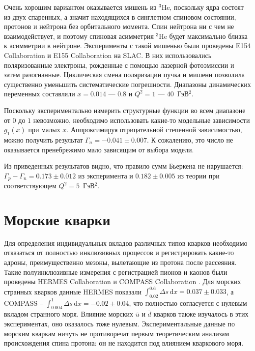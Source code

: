 \documentclass[
	a4paper, 10pt,
	twocolumn
]{article}
\def\d{\,\mathrm{d}}
\def\div{\text{ --- }}
\begin{document}
Очень хорошим вариантом оказывается мишень из $^3$He, поскольку ядра состоят из двух спаренных, а значит находящихся в синглетном спиновом состоянии, протонов и нейтрона без орбитального момента. Спин нейтрона ни с чем не взаимодействует, и поэтому спиновая асимметрия $^3$He будет максимально близка к асимметрии в нейтроне. 
Эксперименты с такой мишенью были проведены E154 Collaboration \cite{E154} и E155 Collaboration \cite{E155} на SLAC. В них использовались поляризованные электроны, рожденные с помощью лазерной фотоэмиссии и затем разогнанные. Циклическая смена поляризации пучка и мишени позволила существенно уменьшить систематические погрешности. Диапазоны динамических переменных составляли $x = 0.014 \div 0.8 $ и $Q^2 = 1 \div 40 $~ГэВ$^2$. 

Поскольку экспериментально измерить структурные функции во всем диапазоне от $0$ до $1$ невозможно, необходимо использовать какие-то модельные зависимости $g_1(x)$ при малых $x$. Аппроксимируя отрицательной степенной зависимостью, можно получить результат $\Gamma_n = -0.041\pm0.007$. К сожалению, это число не оказывается пренебрежимо мало зависящим от выбора модели.

Из приведенных результатов видно, что правило сумм Бьеркена не нарушается: $\Gamma_p - \Gamma_n = 0.173 \pm 0.012$ из эксперимента и $ 0.182\pm0.005 $ из теории при соответствующем $Q^2=5$~ГэВ$^2$. 



\section{Морские кварки}
Для определения индивидуальных вкладов различных типов кварков необходимо отказаться от полностью инклюзивных процессов и регистрировать какие-то адроны, преимущественно мезоны, вылетающие из протона после рассеяния. 
Такие полуинклюзивные измерения с регистрацией пионов и каонов были проведены HERMES Collaboration \cite{HERMES} и COMPASS Collaboration \cite{COMPASS.sea}. 
Для морских странных кварков данные HERMES показали $\int_{0.02}^{0.6}\Delta s\d x = 0.037 \pm 0.033$, а COMPASS -- $\int_{0.004}^1 \Delta s \d x = -0.02 \pm 0.04$, что полностью согласуется с нулевым вкладом странного моря. 
Влияние морских $\bar{u}$ и $\bar{d}$ кварков также изучалось в этих экспериментах, оно оказалось тоже нулевым. Экспериментальные данные по морским кваркам ничуть не противоречат первым теоретическим анализам происхождения спина протона: он не находится под влиянием кваркового моря. 
\end{document}
